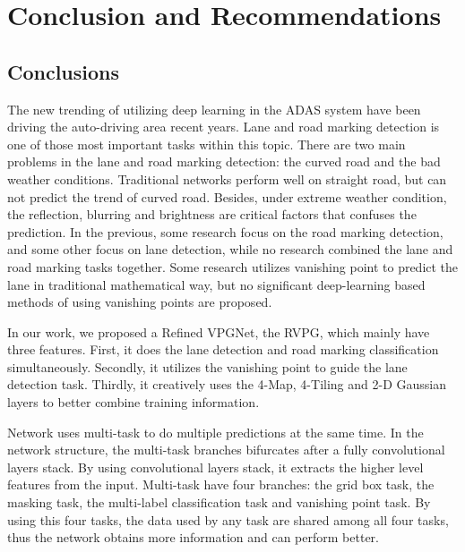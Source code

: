 
\chapter{Conclusion and Recommendations}
\label{cha:conclusion}
\begin{spacing}{1.5}
\setlength{\parskip}{0.3in}

\section{Conclusions}

The new trending of utilizing deep learning in the ADAS system have been driving the auto-driving area recent years. Lane and road marking detection is one of those most important tasks within this topic. There are two main problems in the lane and road marking detection: the curved road and the bad weather conditions. Traditional networks perform well on straight road, but can not predict the trend of curved road. Besides, under extreme weather condition, the reflection, blurring and brightness are critical factors that confuses the prediction. In the previous, some research focus on the road marking detection, and some other focus on lane detection, while no research combined the lane and road marking tasks together. Some research utilizes vanishing point to predict the lane in traditional mathematical way, but no significant deep-learning based methods of using vanishing points are proposed.

In our work, we proposed a Refined VPGNet, the RVPG, which mainly have three features. First, it does the lane detection and road marking classification simultaneously. Secondly, it utilizes the vanishing point to guide the lane detection task. Thirdly, it creatively uses the 4-Map, 4-Tiling and 2-D Gaussian layers to better combine training information.

Network uses multi-task to do multiple predictions at the same time. In the network structure, the multi-task branches bifurcates after a fully convolutional layers stack. By using convolutional layers stack, it extracts the higher level features from the input. Multi-task have four branches: the grid box task, the masking task, the multi-label classification task and vanishing point task. By using this four tasks, the data used by any task are shared among all four tasks, thus the network obtains more information and can perform better.


\end{spacing}
